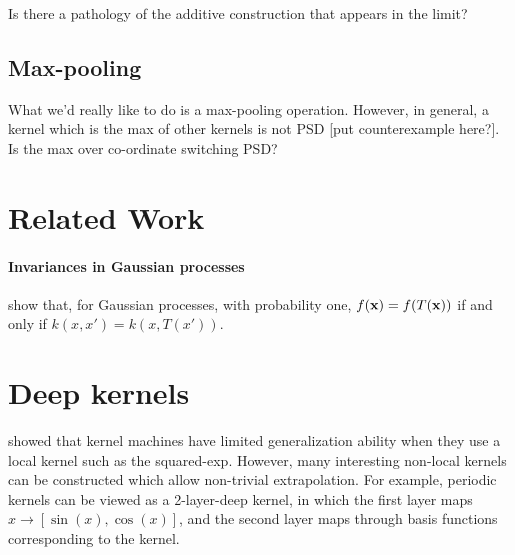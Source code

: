


Is there a pathology of the additive construction that appears in the limit?

\subsection{Max-pooling}
What we'd really like to do is a max-pooling operation.  However, in general, a kernel which is the max of other kernels is not PSD [put counterexample here?].  Is the max over co-ordinate switching PSD?

\section{Related Work}
\label{sec:related_work}

\paragraph{Invariances in Gaussian processes}
\cite{Invariances13} show that, for Gaussian processes, with probability one, $f({\bf{x}}) = f(T({\bf{x}}))$ if and only if $k(x, x') = k(x, T(x'))$.








\section{Deep kernels}
\label{sec:deep_kernels}


\cite{NIPS2005_424} showed that kernel machines have limited generalization ability when they use a local kernel such as the squared-exp.
However, many interesting non-local kernels can be constructed which allow non-trivial extrapolation.
For example, periodic kernels can be viewed as a 2-layer-deep kernel, in which the first layer maps $x \rightarrow [\sin(x), \cos(x)]$, and the second layer maps through basis functions corresponding to the  kernel.

 

